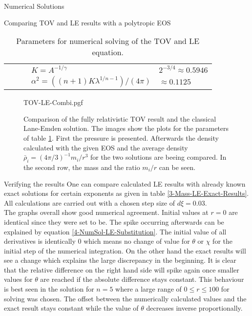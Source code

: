 \begin{section}{Numerical Solutions}
\begin{subsection}{Comparing TOV and LE results with a polytropic EOS}
\begin{table}[H]
\begin{tabular}{@{}llcll@{}}
		&&& $K=A^{-1/\gamma}$ & $2^{-3/4}\approx0.5946$\\
		&&& $\alpha^2=((n+1)K\lambda^{1/n-1})/(4\pi)$ & $\approx0.1125$\\
		\bottomrule
	\end{tabular}
	\caption[Numerical Parameters for TOV and LE equation]{Parameters for numerical solving of the \ac{TOV} and \ac{LE} equation.}
	\label{4-NumSol-TOVParameters}
\end{table}%
\begin{figure}[H]
	\centering
	{TOV-LE-Combi.pgf}
	\caption[Comparison TOV and LE equation]{Comparison of the fully relativistic \ac{TOV} result and the classical Lane-Emden solution. The images show the plots for the parameters of table \ref{4-NumSol-TOVParameters}. First the pressure is presented. Afterwards the density calculated with the given EOS and the average density $\bar{\rho}_i=(4\pi/3)^{-1}m_i/r^3$ for the two solutions are beeing compared. In the second row, the mass and the ratio $m_i/r$ can be seen.}
	\label{4-NumSol-TOVEqEasyEOS}
\end{figure}
\end{subsection}
%
%
\begin{subsection}{Verifying the results}
\label{4-NumSol-Sec-Verifiying-the-results}
One can compare calculated \ac{LE} results with already known exact  solutions for certain exponents as given in table \ref{3-Mass-LE-Exact-Results}. 
All calculations are carried out with a chosen step size of $d\xi=0.03$.\\
The graphs overall show good numerical agreement. 
Initial values at $r=0$ are identical since they were set to be. 
The spike occurring afterwards can be explained by equation \eqref{4-NumSol-LE-Substitution}. 
The initial value of all derivatives is identically $0$ which means no change of value for $\theta$ or $\chi$ for the initial step of the numerical integration. 
On the other hand the exact results will see a change which explains the large discrepancy in the beginning.
It is clear that the relative difference on the right hand side will spike again once smaller values for $\theta$ are reached if the absolute difference stays constant. 
This behaviour is best seen in the solution for $n=5$ where a large range of $0\leq r\leq100$ for solving was chosen. 
The offset between the numerically calculated values and the exact result stays constant while the value of $\theta$ decreases inverse proportionally.
\begin{figure}[H]

\end{figure}
\end{subsection}
\end{section}
